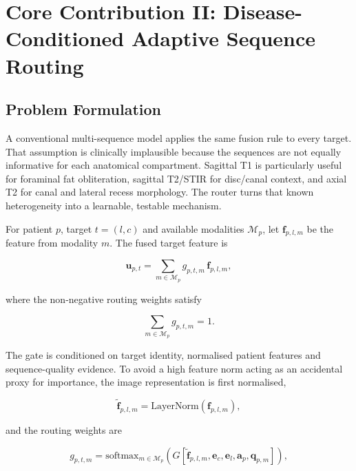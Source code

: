\section{Core Contribution II: Disease-Conditioned Adaptive Sequence Routing}
\label{sec:method-routing}

\subsection{Problem Formulation}
\label{sec:method-routing-problem}

A conventional multi-sequence model applies the same fusion rule to every
target. That assumption is clinically implausible because the sequences are not
equally informative for each anatomical compartment. Sagittal T1 is particularly
useful for foraminal fat obliteration, sagittal T2/STIR for disc/canal context,
and axial T2 for canal and lateral recess morphology. The router turns that
known heterogeneity into a learnable, testable mechanism.

For patient $p$, target $t=(l,c)$ and available modalities
$\mathcal{M}_p$, let $\mathbf{f}_{p,l,m}$ be the feature from modality $m$.
The fused target feature is

\begin{equation}
\mathbf{u}_{p,t}
=
\sum_{m\in\mathcal{M}_p}
g_{p,t,m}\,
\mathbf{f}_{p,l,m},
\label{eq:routed-feature}
\end{equation}

where the non-negative routing weights satisfy

\begin{equation}
\sum_{m\in\mathcal{M}_p} g_{p,t,m}=1.
\label{eq:routing-simplex}
\end{equation}

The gate is conditioned on target identity, normalised patient features and
sequence-quality evidence. To avoid a high feature norm acting as an accidental
proxy for importance, the image representation is first normalised,

\begin{equation}
\tilde{\mathbf{f}}_{p,l,m}
=
\mathrm{LayerNorm}(\mathbf{f}_{p,l,m}),
\label{eq:routing-feature-norm}
\end{equation}

and the routing weights are

\begin{equation}
g_{p,t,m}
=
\mathrm{softmax}_{m\in\mathcal{M}_p}
\left(
G[
\tilde{\mathbf{f}}_{p,l,m},
\mathbf{e}_{c},
\mathbf{e}_{l},
\mathbf{a}_{p},
\mathbf{q}_{p,m}
]
\right),
\label{eq:routing-gate}
\end{equation}

